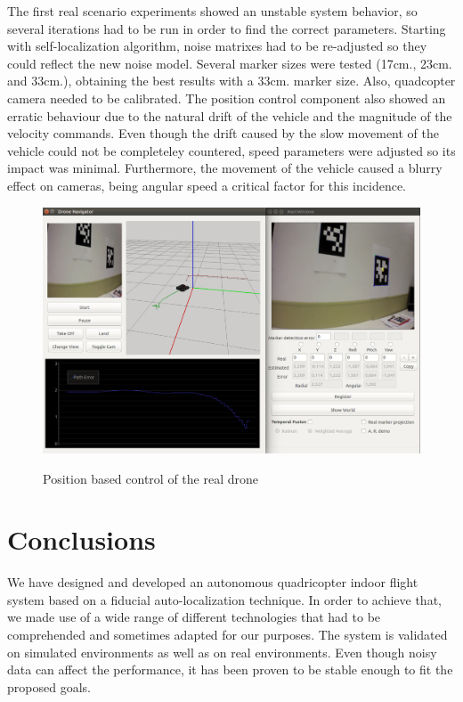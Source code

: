 \documentclass{styles/svproc}
\begin{document}
	The first real scenario experiments showed an unstable system behavior, so several iterations had to be run in order to find the correct parameters. Starting with self-localization algorithm, noise matrixes had to be re-adjusted so they could reflect the new noise model. Several marker sizes were tested (17cm., 23cm.  and 33cm.), obtaining the best results with a 33cm. marker size. Also, quadcopter camera needed to be calibrated. The position control component also showed an erratic behaviour due to the natural drift of the vehicle and the magnitude of the velocity commands. Even though the drift caused by the slow movement of the vehicle could not be completeley countered, speed parameters were adjusted so its impact was minimal. Furthermore, the movement of the vehicle caused a blurry effect on cameras, being angular speed a critical factor for this incidence.
	
	\begin{figure}[h]
		\begin{center}
		{\includegraphics[width=12cm]{appcapture.png}}
		\end{center}
		\caption{Position based control of the real drone}
	\end{figure}


\section{Conclusions}

	We have designed and developed an autonomous quadricopter indoor flight system based on a fiducial auto-localization technique. In order to achieve that, we made use of a wide range of different technologies that had to be comprehended and sometimes adapted for our purposes. The system is validated on simulated environments as well as on real environments. Even though noisy data can affect the performance, it has been proven to be stable enough to fit the proposed goals.
	
\end{document}
